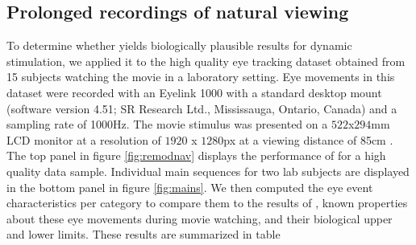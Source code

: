 


    \subsection*{Prolonged recordings of natural viewing}\label{ana_2}


    To determine whether \remodnav yields biologically plausible results for dynamic stimulation, we applied it to the
    high quality eye tracking dataset obtained from 15 subjects watching the movie in a laboratory setting. Eye movements
    in this dataset were recorded with an Eyelink 1000 with a standard desktop mount (software version 4.51; SR Research
    Ltd., Mississauga, Ontario, Canada) and a sampling rate of 1000Hz. The movie stimulus was presented on a $522$x$294$mm
    LCD monitor at a resolution of $1920$ x $1280$px at a viewing distance of 85cm \citep{Hanke2016}.
     The top panel in figure
    \ref{fig:remodnav} displays the performance of \remodnav for a high quality data sample. Individual main sequences
    for two lab subjects are displayed in the bottom panel in figure \ref{fig:mains}. We then computed the eye event
    characteristics per category to compare them to the results of \cite{Andersson2017}, known properties about these
    eye movements during movie watching, and their biological upper and lower limits. These results are summarized in
    table 



